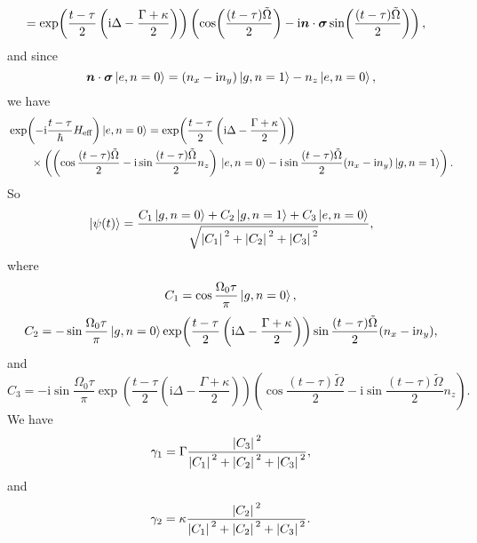 \documentclass[hyperref, a4paper]{article}
\newcommand*{\ii}{\mathrm{i}}
\begin{document}
\begin{itemize}
\[\begin{aligned}
        &= \exp(\frac{t - \tau}{2} \left( \ii \Delta - \frac{\Gamma + \kappa}{2} \right)) \left( \cos(\frac{(t - \tau) \tilde{\Omega}}{2}) - \ii \vb*{n} \cdot \vb*{\sigma} \sin(\frac{(t - \tau) \tilde{\Omega}}{2}) \right),
    \end{aligned}
\]
and since 
\[
    \vb*{n} \cdot \vb*{\sigma} \ket*{e, n=0} = (n_x - \ii n_y) \ket*{g, n=1} - n_z \ket*{e, n=0},
\]
we have 
\[
    \begin{aligned}
        &\exp(- \ii \frac{t - \tau}{\hbar} H_\text{eff}) \ket*{e, n=0} = \exp(\frac{t - \tau}{2} \left( \ii \Delta - \frac{\Gamma + \kappa}{2} \right)) \\
        &\quad \quad \times \left( \left( \cos \frac{(t - \tau) \tilde{\Omega}}{2} - \ii \sin \frac{(t - \tau) \tilde{\Omega}}{2} n_z \right) \ket*{e, n=0} - \ii \sin \frac{(t - \tau) \tilde{\Omega}}{2} (n_x - \ii n_y) \ket*{g, n=1} \right). 
    \end{aligned}
\]
So 
\begin{equation}
    \ket*{\psi(t)} = \frac{C_1 \ket*{g, n=0} + C_2 \ket*{g, n=1} + C_3 \ket*{e, n=0}}{\sqrt{\abs*{C_1}^2 + \abs*{C_2}^2 + \abs*{C_3}^2}} , 
\end{equation}
where 
\begin{equation}
    C_1 =  \cos \frac{\Omega_0 \tau}{\pi} \ket*{g, n=0},
\end{equation}
\begin{equation}
    C_2 = -  \sin \frac{\Omega_0 \tau}{\pi} \ket*{g, n=0} \exp(\frac{t - \tau}{2} \left( \ii \Delta - \frac{\Gamma + \kappa}{2} \right)) \sin \frac{(t - \tau) \tilde{\Omega}}{2} (n_x - \ii n_y) ,
    \label{eq:c2}
\end{equation}
and 
\begin{equation}
    C_3 = - \ii \sin \frac{\Omega_0 \tau}{\pi} \exp(\frac{t - \tau}{2} \left( \ii \Delta - \frac{\Gamma + \kappa}{2} \right)) \left( \cos \frac{(t - \tau) \tilde{\Omega}}{2} - \ii \sin \frac{(t - \tau) \tilde{\Omega}}{2} n_z \right) .
    \label{eq:c3}
\end{equation}
We have 
\begin{equation}
    \gamma_1 = \Gamma \frac{\abs*{C_3}^2}{\abs*{C_1}^2 + \abs*{C_2}^2 + \abs*{C_3}^2},
\end{equation}
and 
\begin{equation}
    \gamma_2 = \kappa \frac{\abs*{C_2}^2}{\abs*{C_1}^2 + \abs*{C_2}^2 + \abs*{C_3}^2}.
\end{equation}


\end{itemize}
\end{document}
